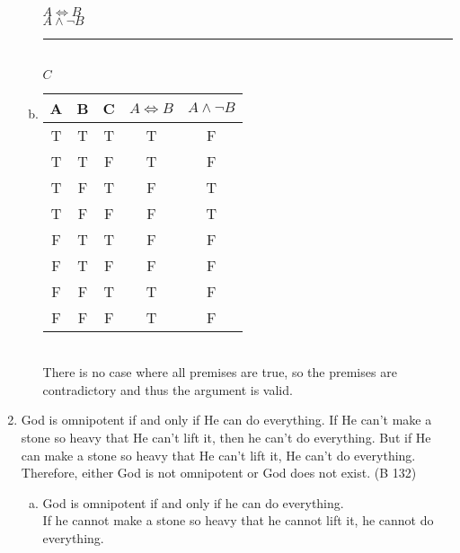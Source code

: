 \documentclass{article}
\begin{document}
\begin{enumerate}
\begin{enumerate}[(a)]
                        $A \iff B$\\
                        $A \land \neg B$\\
                        \rule{5em}{.5pt}\\
                        $C$
                  \item \begin{tabular}{c|c|c|c|c}
                              A & B & C & $A \iff B$ & $A \land \neg B$ \\
                              \hline
                              \rowcolor{lightgray} T & T & T & T          & F                \\
                              \rowcolor{lightgray} T & T & F & T          & F                \\
                              \rowcolor{lightgray} T & F & T & F          & T                \\
                              \rowcolor{lightgray} T & F & F & F          & T                \\
                              \rowcolor{lightgray} F & T & T & F          & F                \\
                              \rowcolor{lightgray} F & T & F & F          & F                \\
                              \rowcolor{lightgray} F & F & T & T          & F                \\
                              \rowcolor{lightgray} F & F & F & T          & F                \\
                        \end{tabular}\\
                        There is no case where all premises are true, so the premises are contradictory and thus the argument is valid.
            \end{enumerate}
      \item God is omnipotent if and only if He can do everything. If He can't make a stone so heavy that He can't lift it, then he can't do everything. But if He can make a stone so heavy that He can't lift it, He can't do everything. Therefore, either God is not omnipotent or God does not exist. (B 132)
            \begin{enumerate}[(a)]
                  \item God is omnipotent if and only if he can do everything.\\
                        If he cannot make a stone so heavy that he cannot lift it, he cannot do everything.\\

\end{enumerate}
\end{enumerate}
\end{document}
